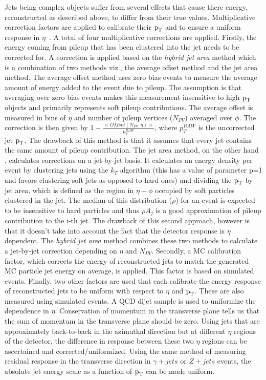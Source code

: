 Jets being complex objects suffer from several effects that cause there energy, reconstructed as described above, to differ from their true values. Multiplicative correction factors are applied to calibrate their $\text{p}_\text{T}$ and to ensure a uniform response in $\eta$~\cite{jet_recon1,jet_recon2}. A total of four multiplicative corrections are applied. Firstly, the energy coming from pileup that has been clustered into the jet needs to be corrected for. A correction is applied based on the \textit{hybrid jet area} method which is a combination of two methods viz., the average offset method and the jet area method. The average offset method uses zero bias events to measure the average amount of energy added to the event due to pileup. The assumption is that averaging over zero bias events makes this measurement insensitive to high $\text{p}_\text{T}$ objects and primarily represents soft pileup contributions. The average offset is measured in bins of $\eta$ and number of pileup vertices ($N_{PV}$) averaged over $\phi$. The correction is then given by $1-\frac{<Offset(N_{PV},\eta)>}{p_{T}^{RAW}}$, where $p_{T}^{RAW}$  is the uncorrected jet $\text{p}_\text{T}$. The drawback of this method is that it assumes that every jet contains the same amount of pileup contribution. The jet area method, on the other hand , calculates corrections on a jet-by-jet basis. It calculates an energy density  per event  by clustering jets using the $k_{T}$ algorithm (this has a value of parameter p=1 and favors clustering soft jets as opposed to hard ones) and dividing the $\text{p}_\text{T}$ by jet area, which is defined as the region in $\eta-\phi$ occupied by soft particles clustered in the jet. The median of this distribution ($\rho$) for an event is expected to be insensitive to hard particles and thus $\rho A_{j}$ is a good approximation of pileup contribution to the i-th jet. The drawback of this second approach, however is that it doesn't take into account the fact that the detector response is $\eta$ dependent. The \textit{hybrid jet area} method combines these two methods to calculate a jet-by-jet correction depending on $\eta$ and $N_{PV}$. Secondly, a MC calibration factor, which corrects the energy of reconstructed jets to match the generated MC particle jet energy on average, is applied. This factor is based on simulated events. Finally, two other factors are used that each calibrate the energy response of reconstructed jets to be uniform with respect to $\eta$ and $\text{p}_\text{T}$. These are also measured using simulated events. A QCD dijet sample is used to uniformize the dependence in $\eta$. Conservation of momentum in the transverse plane tells us that the sum of momentum in the transverse plane should be zero. Using jets that are approximately back-to-back in the azimuthal direction but at different $\eta$ regions of the detector, the difference in response between these two $\eta$ regions can be ascertained and corrected/uniformized. Using the same method of measuring residual response in the transverse direction in $\gamma + jets$ or $Z +jets$  events, the absolute jet energy scale as a function of $\text{p}_\text{T}$ can be made uniform.


